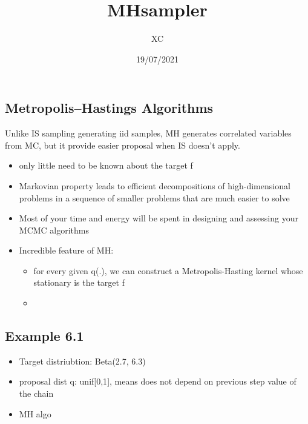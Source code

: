 \documentclass[
]{article}
\title{MHsampler}
\author{XC}
\date{19/07/2021}
\providecommand{\tightlist}{%
  \setlength{\itemsep}{0pt}\setlength{\parskip}{0pt}}
\begin{document}
\maketitle

\hypertarget{metropolishastings-algorithms}{%
\subsection{Metropolis--Hastings
Algorithms}\label{metropolishastings-algorithms}}

Unlike IS sampling generating iid samples, MH generates correlated
variables from MC, but it provide easier proposal when IS doesn't apply.

\begin{itemize}
\item
  only little need to be known about the target f
\item
  Markovian property leads to efficient decompositions of
  high-dimensional problems in a sequence of smaller problems that are
  much easier to solve
\item
  Most of your time and energy will be spent in designing and assessing
  your MCMC algorithms
\item
  Incredible feature of MH:

  \begin{itemize}
  \tightlist
  \item
    for every given q(.), we can construct a Metropolis-Hasting kernel
    whose stationary is the target f
  \item
  \end{itemize}
\end{itemize}

\hypertarget{example-6.1}{%
\subsection{Example 6.1}\label{example-6.1}}

\begin{itemize}
\tightlist
\item
  Target distriubtion: Beta(2.7, 6.3)
\item
  proposal dist q: unif{[}0,1{]}, means does not depend on previous step
  value of the chain
\item
  MH algo
\end{itemize}
\end{document}
